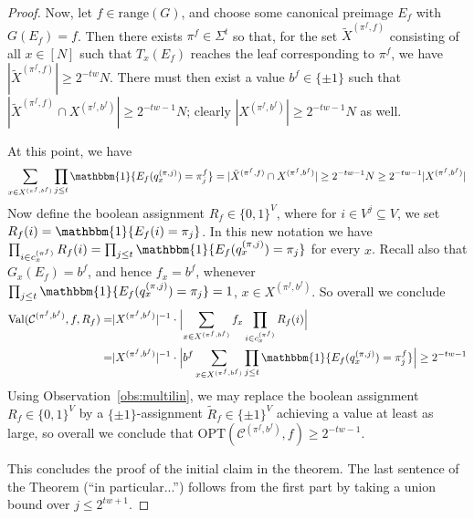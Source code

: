 \documentclass[11pt]{article}
\newcommand{\B}{\{0,1\}}
\newcommand{\rng}{\mathrm{range}}
\newcommand{\p}[1]{{(#1)}}
\newcommand{\Val}{\mathrm{Val}}
\newcommand{\Opt}{\mathrm{OPT}}
\newcommand{\N}{[N]}
\begin{document}
\begin{proof}
Now, let $f \in \rng(G)$, and choose some canonical preimage $E_f$ with $G(E_f)=f$. Then there exists $\pi^f \in \Sigma^t$ so that, for the set $\tilde{X}^\p{\pi^f,f}$ consisting of all $x \in \N$ such that $T_x(E_f)$ reaches the leaf corresponding to $\pi^f$, we have $|\tilde{X}^\p{\pi^f,f}| \geq 2^{-tw}N$. There must then exist a value $b^f\in \{\pm 1\}$ such that $|\tilde{X}^\p{\pi^f,f} \cap X^\p{\pi^f,b^f}| \geq 2^{-tw-1}N$; clearly $|X^\p{\pi^f,b^f}| \geq 2^{-tw-1}N$ as well. 

At this point, we have
\[
 \sum_{x\in X^\p{\pi^f,b^f}} \prod_{j \leq t} \mathbbm{1}\{E_f(q^\p{\pi,j}_x)= \pi^f_j\} = |\tilde{X}^\p{\pi^f,f} \cap X^\p{\pi^f,b^f}| \geq 2^{-tw-1}N \geq 2^{-tw-1}|X^\p{\pi^f,b^f}|
\]
Now define the boolean assignment $R_f \in \B^{V}$, where for $i \in V^j \subseteq V$, we set $R_f(i) = \mathbbm{1}\{E_f(i)=\pi_j\}$. In this new notation we have $\prod_{i \in c^\p{\pi^f}_x} R_f(i) = \prod_{j \leq t}\mathbbm{1}\{E_f(q^\p{\pi,j}_x) = \pi_j\}$ for every $x$. Recall also that $G_x(E_f) = b^f$, and hence $f_x = b^f$, whenever $\prod_{j \leq t}\mathbbm{1}\{E_f(q^\p{\pi,j}_x) = \pi_j\}=1$, $x\in X^\p{\pi^f,b^f}$. So overall we conclude
\begin{align*}
\Val(\mathcal{C}^\p{\pi^f,b^f},f,R_f) =&|X^\p{\pi^f,b^f}|^{-1} \cdot \Bigl|\sum_{x\in X^\p{\pi^f,b^f}} f_x\prod_{i \in c^\p{\pi^f}_x} R_f(i) \Bigr|\\ =&  |X^\p{\pi^f,b^f}|^{-1} \cdot \Bigl| b^f \sum_{x\in X^\p{\pi^f,b^f}} \prod_{j \leq t} \mathbbm{1}\{E_f(q^\p{\pi,j}_x)= \pi^f_j\}\Bigr| \geq 2^{-tw-1}
\end{align*}
Using Observation~\ref{obs:multilin}, we may replace the boolean assignment $R_f\in \B^V$ by a $\{\pm 1\}$-assignment $\tilde{R}_f \in \{\pm 1\}^V$ achieving a value at least as large, so overall we conclude that $\Opt(\mathcal{C}^\p{\pi^f,b^f},f) \geq 2^{-tw-1}$.

This concludes the proof of the initial claim in the theorem. The last sentence of the Theorem (``in particular...'') follows from the first part by taking a union bound over $j \leq 2^{tw+1}$.
\end{proof}
\end{document}
